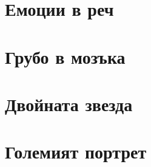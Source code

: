 

\chapter{Емоции в реч}
\label{chap:speech}
    
    
    
    
    
    
\chapter{Грубо в мозъка}
    
    
    
\chapter{Двойната звезда}
    
\chapter{Големият портрет}
\begin{appendices}
    
    
    
\end{appendices}
\printbibliography[heading=bibintoc]